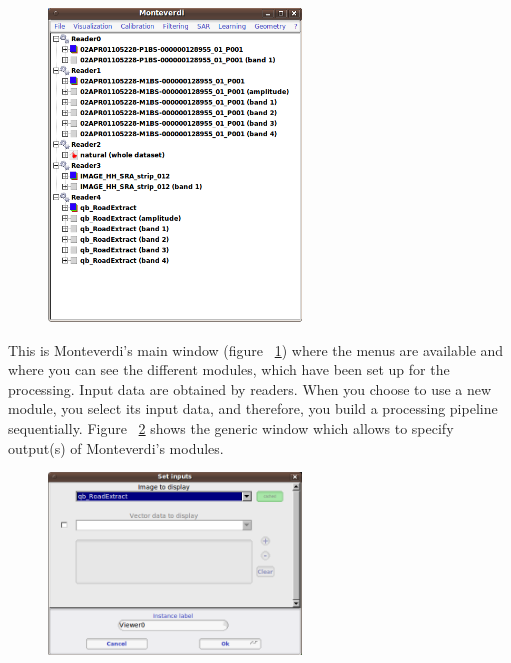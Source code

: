 \begin{figure}
  \center
  \includegraphics[width=0.6\textwidth]{../Art/MonteverdiImages/monteverdi_mainwindow.png}
  \label{fig:mainwindow}
\end{figure}

This is Monteverdi's main window (figure ~\ref{fig:mainwindow}) where the
menus are available and where you can see the different modules, which
have been set up for the processing. Input data are obtained by
readers. When you choose to use a new module, you select its input
data, and therefore, you build a processing pipeline sequentially.
Figure ~\ref{fig:inputswindow} shows the generic window which allows to
specify output(s) of Monteverdi's modules.  

\begin{figure} 
  \center
  \includegraphics[width=0.6\textwidth]{../Art/MonteverdiImages/monteverdi_inputs_window.png}
    \label{fig:inputswindow} 
\end{figure} 


